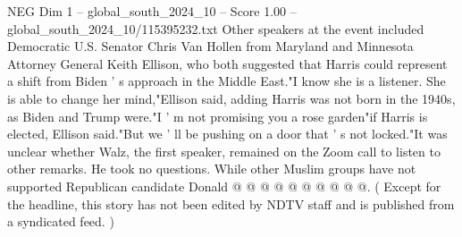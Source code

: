 \begin{textsample}{NEG Dim 1 – global\_south\_2024\_10 – Score 1.00 – global\_south\_2024\_10/115395232.txt}
Other speakers at the event included Democratic U.S.
Senator Chris Van Hollen from Maryland and Minnesota Attorney General Keith Ellison, who both suggested that Harris could represent a shift from Biden ' s approach in the Middle East."I know she is a listener.
She is able to change her mind,"Ellison said, adding Harris was not born in the 1940s, as Biden and Trump were."I ' m not promising you a rose garden"if Harris is elected, Ellison said."But we ' ll be pushing on a door that ' s not locked."It was unclear whether Walz, the first speaker, remained on the Zoom call to listen to other remarks.
He took no questions.
While other Muslim groups have not supported Republican candidate Donald @ @ @ @ @ @ @ @ @ @. ( Except for the headline, this story has not been edited by NDTV staff and is published from a syndicated feed. )

\end{textsample}

